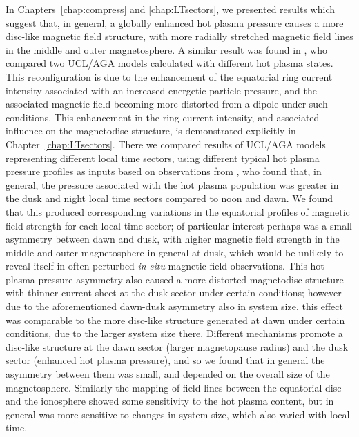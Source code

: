 In Chapters~\ref{chap:compress} and \ref{chap:LTsectors}, we presented results which suggest that, in general, a globally enhanced hot plasma pressure causes a more disc-like magnetic field structure, with more radially stretched magnetic field lines in the middle and outer magnetosphere. A similar result was found in \citet{achilleos2010b}, who compared two UCL/AGA models calculated with different hot plasma states. This reconfiguration is due to the enhancement of the equatorial ring current intensity associated with an increased energetic particle pressure, and the associated magnetic field becoming more distorted from a dipole under such conditions. This enhancement in the ring current intensity, and associated influence on the magnetodisc structure, is demonstrated explicitly in Chapter~\ref{chap:LTsectors}. There we compared results of UCL/AGA models representing different local time sectors, using different typical hot plasma pressure profiles as inputs based on observations from \citet{sergis2017}, who found that, in general, the pressure associated with the hot plasma population was greater in the dusk and night local time sectors compared to noon and dawn. We found that this produced corresponding variations in the equatorial profiles of magnetic field strength for each local time sector; of particular interest perhaps was a small asymmetry between dawn and dusk, with higher magnetic field strength in the middle and outer magnetosphere in general at dusk, which would be unlikely to reveal itself in often perturbed \textit{in situ} magnetic field observations. This hot plasma pressure asymmetry also caused a more distorted magnetodisc structure with thinner current sheet at the dusk sector under certain conditions; however due to the aforementioned dawn-dusk asymmetry also in system size, this effect was comparable to the more disc-like structure generated at dawn under certain conditions, due to the larger system size there. Different mechanisms promote a disc-like structure at the dawn sector (larger magnetopause radius) and the dusk sector (enhanced hot plasma pressure), and so we found that in general the asymmetry between them was small, and depended on the overall size of the magnetosphere. Similarly the mapping of field lines between the equatorial disc and the ionosphere showed some sensitivity to the hot plasma content, but in general was more sensitive to changes in system size, which also varied with local time.


